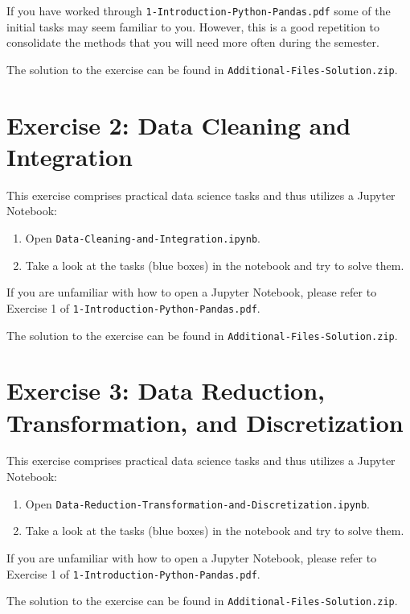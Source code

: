 \documentclass[
english,
smallborders
]{i6prcsht}
\begin{document}
If you have worked through \texttt{1-Introduction-Python-Pandas.pdf} some of the initial tasks may seem familiar to you. However, this is a good repetition to consolidate the methods that you will need more often during the semester.

\begin{solution}
	The solution to the exercise can be found in \texttt{Additional-Files-Solution.zip}.
\end{solution}

\section*{Exercise 2: Data Cleaning and Integration}

This exercise comprises practical data science tasks and thus utilizes a Jupyter Notebook:

\begin{enumerate}
	\item Open \texttt{Data-Cleaning-and-Integration.ipynb}.
	\item Take a look at the tasks (blue boxes) in the notebook and try to solve them.
\end{enumerate}

If you are unfamiliar with how to open a Jupyter Notebook, please refer to Exercise 1 of \texttt{1-Introduction-Python-Pandas.pdf}.

\begin{solution}
	The solution to the exercise can be found in \texttt{Additional-Files-Solution.zip}.
\end{solution}

\section*{Exercise 3: Data Reduction, Transformation, and Discretization}

This exercise comprises practical data science tasks and thus utilizes a Jupyter Notebook:

\begin{enumerate}
	\item Open \texttt{Data-Reduction-Transformation-and-Discretization.ipynb}.
	\item Take a look at the tasks (blue boxes) in the notebook and try to solve them.
\end{enumerate}

If you are unfamiliar with how to open a Jupyter Notebook, please refer to Exercise 1 of \texttt{1-Introduction-Python-Pandas.pdf}.

\begin{solution}
	The solution to the exercise can be found in \texttt{Additional-Files-Solution.zip}.
\end{solution}
\end{document}

